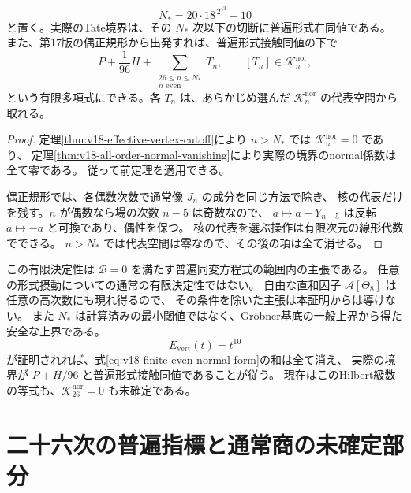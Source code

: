 \begin{corollary}[実際の境界に対する一つの普遍上界]
\label{cor:v18-explicit-finite-boundary}
\begin{equation}\label{eq:v18-explicit-finite-degree}
 N_* =20\cdot18^{\,2^{43}}-10
\end{equation}
と置く。実際のTate境界は、その $N_*$ 次以下の切断に普遍形式右同値である。
また、第17版の偶正規形から出発すれば、普遍形式接触同値の下で
\begin{equation}\label{eq:v18-finite-even-normal-form}
 P+\frac1{96}H+
 \sum_{\substack{26\le n\le N_*\\n\text{ even}}}T_n,
 \qquad [T_n]\in\mathcal K_n^{\mathrm{nor}},
\end{equation}
という有限多項式にできる。各 $T_n$ は、あらかじめ選んだ
$\mathcal K_n^{\mathrm{nor}}$ の代表空間から取れる。
\end{corollary}

\begin{proof}
定理\ref{thm:v18-effective-vertex-cutoff}により
$n>N_*$ では $\mathcal K_n^{\mathrm{nor}}=0$ であり、
定理\ref{thm:v18-all-order-normal-vanishing}により実際の境界のnormal係数は全て零である。
従って前定理を適用できる。

偶正規形では、各偶数次数で通常像 $J_n$ の成分を同じ方法で除き、
核の代表だけを残す。$n$ が偶数なら場の次数 $n-5$ は奇数なので、
$a\mapsto a+Y_{n-5}$ は反転 $a\mapsto-a$ と可換であり、偶性を保つ。
核の代表を選ぶ操作は有限次元の線形代数でできる。
$n>N_*$ では代表空間は零なので、その後の項は全て消せる。
\end{proof}

\begin{remark}[有限決定性の範囲と残る問題]
この有限決定性は $\mathcal B=0$ を満たす普遍同変方程式の範囲内の主張である。
任意の形式摂動についての通常の有限決定性ではない。
自由な直和因子 $\mathcal A[\Theta_8]$ は任意の高次数にも現れ得るので、
その条件を除いた主張は本証明からは導けない。
また $N_*$ は計算済みの最小閾値ではなく、Gr\"obner基底の一般上界から得た安全な上界である。
\[
 E_{\mathrm{vert}}(t)=t^{10}
\]
が証明されれば、式\eqref{eq:v18-finite-even-normal-form}の和は全て消え、
実際の境界が $P+H/96$ と普遍形式接触同値であることが従う。
現在はこのHilbert級数の等式も、$\mathcal K_{26}^{\mathrm{nor}}=0$ も未確定である。
\end{remark}



\section{二十六次の普遍指標と通常商の未確定部分}
\label{sec:v18-characters}

